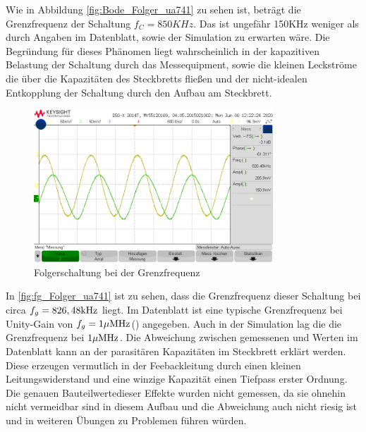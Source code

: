 Wie in Abbildung \ref{fig:Bode_Folger_ua741} zu sehen ist, beträgt die Grenzfrequenz der Schaltung $f_C=850KHz$. Das ist ungefähr 150KHz weniger als durch Angaben im Datenblatt, sowie der Simulation zu erwarten wäre. Die Begründung für dieses Phänomen liegt wahrscheinlich in der kapazitiven Belastung der Schaltung durch das Messequipment, sowie die kleinen Leckströme die über die Kapazitäten des Steckbretts fließen und der nicht-idealen Entkopplung der Schaltung durch den Aufbau am Steckbrett. 
\begin{figure}[H]
    \centering
    \includegraphics[width=0.8\textwidth]{Lab_1/Messungen/Folger/fg.png}
    \caption{Folgerschaltung bei der Grenzfrequenz}
    \label{fig:fg_Folger_ua741}
\end{figure}
In \autoref{fig:fg_Folger_ua741} ist zu sehen, dass die Grenzfrequenz dieser Schaltung bei circa $f_g=826,48\text{kHz}$ liegt. Im Datenblatt ist eine typische Grenzfrequenz bei Unity-Gain von $f_g=1\mu\text{MHz}$(\cite[9]{ti:ua741}) angegeben. Auch in der Simulation lag die die Grenzfrequenz bei $1\mu\text{MHz}$. Die Abweichung zwischen gemessenen und Werten im Datenblatt kann an der parasitären Kapazitäten im Steckbrett erklärt werden. Diese erzeugen vermutlich in der Feebackleitung durch einen kleinen Leitungswiderstand und eine winzige Kapazität einen Tiefpass erster Ordnung. Die genauen \glqq Bauteilwerte\grqq dieser Effekte wurden nicht gemessen, da sie ohnehin nicht vermeidbar sind in diesem Aufbau und die Abweichung auch nicht riesig ist und in weiteren Übungen zu Problemen führen würden.

